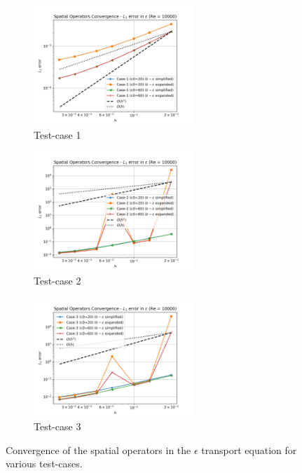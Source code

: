 \begin{figure}[htbp!]
  \begin{subfigure}{7cm}
    \centering\includegraphics[width=6cm]{Code-Figures/keps/keps-op-conv/eps_conv_tc_1_re_10000.png}
    \caption{Test-case 1}
  \end{subfigure}
  \begin{subfigure}{7cm}
    \centering\includegraphics[width=6cm]{Code-Figures/keps/keps-op-conv/eps_conv_tc_2_re_10000.png}
    \caption{Test-case 2}
  \end{subfigure}
  \begin{subfigure}{7cm}
    \centering\includegraphics[width=6cm]{Code-Figures/keps/keps-op-conv/eps_conv_tc_3_re_10000.png}
    \caption{Test-case 3}
  \end{subfigure}
  \caption{Convergence of the spatial operators in the $\epsilon$ transport equation for various test-cases.}
  \label{fig:eps-spatial-ooc}
\end{figure}

